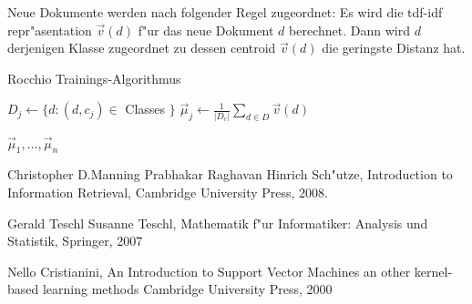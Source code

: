 \documentclass[12pt,a4paper,twoside]{article}
\begin{document}
Neue Dokumente werden nach folgender Regel zugeordnet: Es wird die tdf-idf repr"asentation $\vec v (d)$ f"ur das neue Dokument $d$ berechnet. Dann wird $d$ derjenigen Klasse zugeordnet zu dessen centroid $\vec v (d)$ die geringste Distanz hat.

\begin{algorithm}
\caption{Rocchio Trainings-Algorithmus}
\begin{algorithmic}

\State $ D_j \gets  \{d : (d,c_j) \in$ Classes $\}$
\State  $\vec \mu_j \gets \frac{1}{|D_c|} \sum_{d \in D} \vec v (d)$
\EndFor

\Return ${\vec \mu_1, \dots , \vec \mu_n }$    
 \end{algorithmic}  
\end{algorithm}




\begin{thebibliography}{99}
Christopher D.Manning Prabhakar Raghavan Hinrich Sch"utze,
Introduction to Information Retrieval,
Cambridge University Press,
2008.

Gerald Teschl Susanne Teschl,
Mathematik f"ur Informatiker: Analysis und Statistik,
Springer,
2007

Nello Cristianini,
An Introduction to Support Vector Machines an other kernel-based learning methods
Cambridge University Press,
2000

\end{thebibliography}
\end{document}
